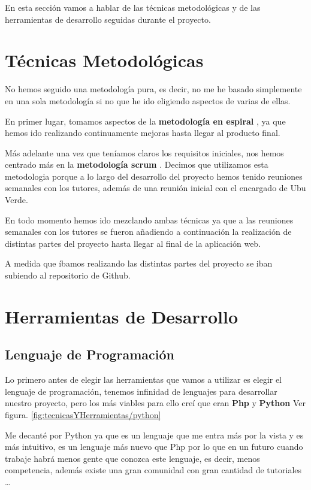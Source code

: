 En esta sección vamos a hablar de las técnicas metodológicas y de las herramientas de desarrollo seguidas durante el proyecto.

\section{Técnicas Metodológicas}
No hemos seguido una metodología pura, es decir, no me he basado simplemente en una sola metodología si no que he ido eligiendo aspectos de varias de ellas.

En primer lugar, tomamos aspectos de la \textbf{metodología en espiral} \cite{ModeloenEspiral}, ya que hemos ido realizando continuamente mejoras hasta llegar al producto final.

Más adelante una vez que teníamos claros los requisitos iniciales, nos hemos centrado más en la \textbf{metodología scrum} \cite{MetodologiaScrum}. Decimos que utilizamos esta metodologia porque a lo largo del desarrollo del proyecto hemos tenido reuniones semanales con los tutores, además de una reunión inicial con el encargado de Ubu Verde.

En todo momento hemos ido mezclando ambas técnicas ya que a las reuniones semanales con los tutores se fueron añadiendo a continuación la realización de distintas partes del proyecto hasta llegar al final de la aplicación web.

A medida que íbamos realizando las distintas partes del proyecto se iban subiendo al repositorio de Github.

\section{Herramientas de Desarrollo}

\subsection{Lenguaje de Programación}
Lo primero antes de elegir las herramientas que vamos a utilizar es elegir el lenguaje de programación, tenemos infinidad de lenguajes para desarrollar nuestro proyecto, pero los más viables para ello creí que eran \textbf{Php} \cite{Php} y \textbf{Python} \cite{Python} Ver figura. \ref{fig:tecnicasYHerramientas/python}


Me decanté por Python ya que es un lenguaje que me entra más por la vista y es más intuitivo, es un lenguaje más nuevo que Php por lo que en un futuro cuando trabaje habrá menos gente que conozca este lenguaje, es decir, menos competencia, además existe una gran comunidad con gran cantidad de tutoriales \ldots

